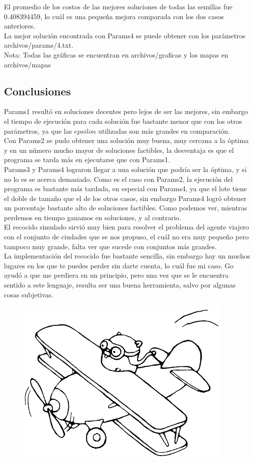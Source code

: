 \documentclass[12pt]{article}
\begin{document}
El promedio de los costos de las mejores soluciones de todas las semillas fue 0.408394459, lo cuál es una pequeña mejora comparada con los dos casos anteriores. \\

La mejor solución encontrada con Params4 se puede obtener con los parámetros \textsf{archivos/params/4.txt}. \\

Nota: Todas las gráficas se encuentran en \textsf{archivos/graficas} y los mapas en \textsf{archivos/mapas}

\subsection{Conclusiones}

Params1 resultó en soluciones decentes pero lejos de ser las mejores, sin embargo el tiempo de ejecución para cada solución fue bastante menor que con los otros parámetros, ya que las $epsilon$ utilizadas son más grandes en comparación. \\

Con Params2 se pudo obtener una solución muy buena, muy cercana a la óptima y en un número mucho mayor de soluciones factibles, la desventaja es que el programa se tarda más en ejecutarse que con Params1. \\

Params3 y Params4 lograron llegar a una solución que podría ser la óptima, y si no lo es se acerca demasiado. Como es el caso con Params2, la ejecución del programa es bastante más tardada, en especial con Params4, ya que el lote tiene el doble de tamaño que el de los otros casos, sin embargo Params4 logró obtener un porcentaje bastante alto de soluciones factibles. Como podemos ver, mientras perdemos en tiempo ganamos en soluciones, y al contrario. \\

El recocido simulado sirvió muy bien para resolver el problema del agente viajero con el conjunto de ciudades que se nos propuso, el cuál no era muy pequeño pero tampoco muy grande, falta ver que sucede con conjuntos más grandes. \\

La implementación del recocido fue bastante sencilla, sin embargo hay un muchos lugares en los que te puedes perder sin darte cuenta, lo cuál fue mi caso. Go ayudó a que me perdiera en un principio, pero una vez que se le encuentra sentido a este lenguaje, resulta ser una buena herramienta, salvo por algunas cosas subjetivas. \\


\begin{figure}[b]
  \includegraphics[scale=0.3, right]{../archivos/otros/gopher.png} \\
\end{figure}
\end{document}
